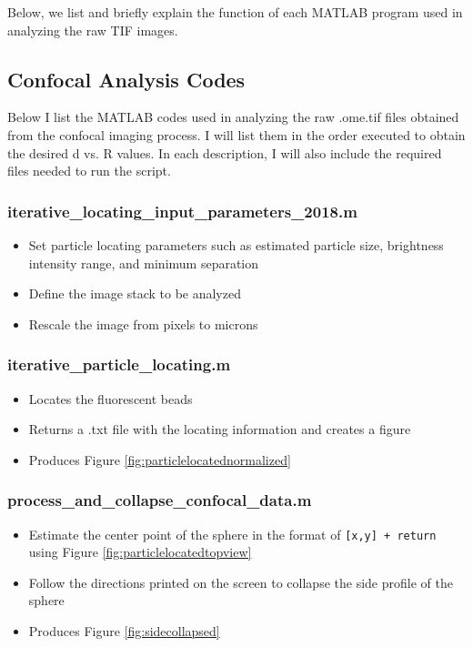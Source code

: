 Below, we list and briefly explain the function of each MATLAB program used in analyzing the raw TIF images.


\def\code#1{\texttt{#1}}

\subsection{Confocal Analysis Codes}
Below I list the MATLAB codes used in analyzing the raw .ome.tif files obtained from the confocal imaging process. I will list them in the order executed to obtain the desired d vs. R values. In each description, I will also include the required files needed to run the script.

\subsubsection*{iterative\_locating\_input\_parameters\_2018.m}
\begin{itemize}
	\item Set particle locating parameters such as estimated particle size, brightness intensity range, and minimum separation
	\item Define the image stack to be analyzed
	\item Rescale the image from pixels to microns
\end{itemize}
\subsubsection*{iterative\_particle\_locating.m}
\begin{itemize}
	\item Locates the fluorescent beads
	\item Returns a .txt file with the locating information and creates a figure 
	\item Produces Figure \ref{fig:particlelocatednormalized}
\end{itemize}
\subsubsection*{process\_and\_collapse\_confocal\_data.m}
\begin{itemize}
	\item Estimate the center point of the sphere in the format of \code{[x,y] + return} using Figure \ref{fig:particlelocatedtopview}
	\item Follow the directions printed on the screen to collapse the side profile of the sphere
	\item Produces Figure \ref{fig:sidecollapsed}
\end{itemize}
